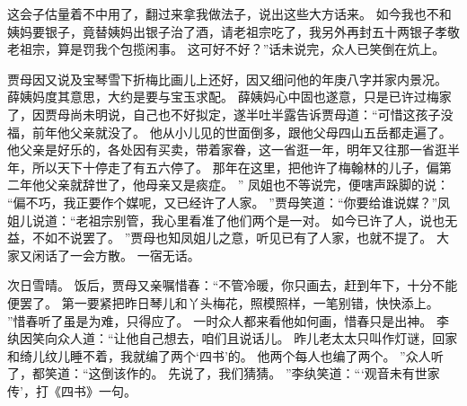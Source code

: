这会子估量着不中用了，翻过来拿我做法子，说出这些大方话来。
如今我也不和姨妈要银子，竟替姨妈出银子治了酒，请老祖宗吃了，我另外再封五十两银子孝敬老祖宗，算是罚我个包揽闲事。
这可好不好？”话未说完，众人已笑倒在炕上。
\par
贾母因又说及宝琴雪下折梅比画儿上还好，因又细问他的年庚八字并家内景况。
薛姨妈度其意思，大约是要与宝玉求配。
薛姨妈心中固也遂意，只是已许过梅家了，因贾母尚未明说，自己也不好拟定，遂半吐半露告诉贾母道：“可惜这孩子没福，前年他父亲就没了。
他从小儿见的世面倒多，跟他父母四山五岳都走遍了。
他父亲是好乐的，各处因有买卖，带着家眷，这一省逛一年，明年又往那一省逛半年，所以天下十停走了有五六停了。
那年在这里，把他许了梅翰林的儿子，偏第二年他父亲就辞世了，他母亲又是痰症。
”
凤姐也不等说完，便嗐声跺脚的说：
“偏不巧，我正要作个媒呢，又已经许了人家。
”贾母笑道：“你要给谁说媒？”凤姐儿说道：“老祖宗别管，我心里看准了他们两个是一对。
如今已许了人，说也无益，不如不说罢了。
”贾母也知凤姐儿之意，听见已有了人家，也就不提了。
大家又闲话了一会方散。
一宿无话。
\par
次日雪晴。
饭后，贾母又亲嘱惜春：“不管冷暖，你只画去，赶到年下，十分不能便罢了。
第一要紧把昨日琴儿和丫头梅花，照模照样，一笔别错，快快添上。
”惜春听了虽是为难，只得应了。
一时众人都来看他如何画，惜春只是出神。
李纨因笑向众人道：“让他自己想去，咱们且说话儿。
昨儿老太太只叫作灯谜，回家和绮儿纹儿睡不着，我就编了两个‘四书’的。
他两个每人也编了两个。
”众人听了，都笑道：“这倒该作的。
先说了，我们猜猜。
”李纨笑道：“‘观音未有世家传’，打《四书》一句。

